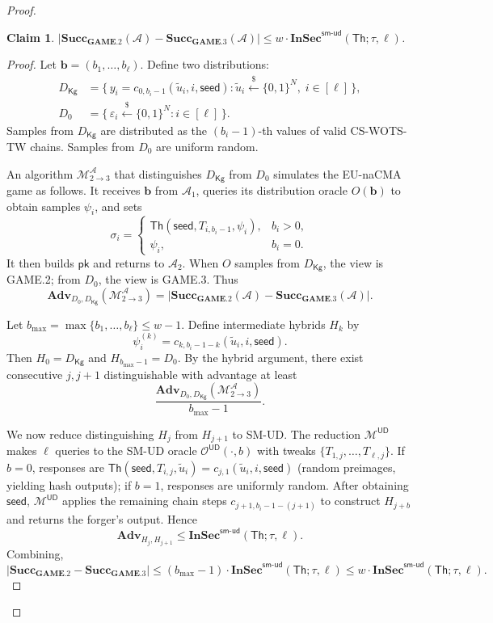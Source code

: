 \documentclass[11pt,a4paper]{article}
\newtheorem{claim}[theorem]{Claim}
\newcommand{\Th}{\mathsf{Th}}
\newcommand{\bits}{\{0,1\}}
\newcommand{\pk}{\mathsf{pk}}
\newcommand{\seed}{\mathsf{seed}}
\newcommand{\InSec}[1]{\mathbf{InSec}^{\mathsf{#1}}}
\newcommand{\Succ}{\mathbf{Succ}}
\newcommand{\Adv}{\mathbf{Adv}}
\newcommand{\GAME}{\mathbf{GAME}}
\newcommand{\Nbits}{N}
\begin{document}
\begin{proof}
\begin{claim}
$|\Succ_{\GAME.2}(\mathcal{A}) - \Succ_{\GAME.3}(\mathcal{A})| \le w \cdot \InSec{sm\text{-}ud}(\Th; \tau, \ell)$.
\end{claim}

\begin{proof}
Let $\mathbf{b} = (b_1,\ldots,b_\ell)$. Define two distributions:
\begin{align*}
D_{\mathsf{Kg}} &= \{\,y_i = c_{0,b_i-1}(\tilde{u}_i, i, \seed) : \tilde{u}_i \xleftarrow{\$} \bits^\Nbits,\; i \in [\ell]\,\},\\
D_0 &= \{\,\varepsilon_i \xleftarrow{\$} \bits^\Nbits : i \in [\ell]\,\}.
\end{align*}
Samples from $D_{\mathsf{Kg}}$ are distributed as the $(b_i-1)$-th values of valid CS-WOTS-TW chains. Samples from $D_0$ are uniform random.

An algorithm $\mathcal{M}^{\mathcal{A}}_{2\to 3}$ that distinguishes $D_{\mathsf{Kg}}$ from $D_0$ simulates the EU-naCMA game as follows. It receives $\mathbf{b}$ from $\mathcal{A}_1$, queries its distribution oracle $O(\mathbf{b})$ to obtain samples $\psi_i$, and sets
\[
\sigma_i =
\begin{cases}
\Th(\seed, T_{i,b_i-1}, \psi_i), & b_i>0,\\
\psi_i, & b_i=0.
\end{cases}
\]
It then builds $\pk$ and returns to $\mathcal{A}_2$. When $O$ samples from $D_{\mathsf{Kg}}$, the view is GAME.2; from $D_0$, the view is GAME.3. Thus
\[
\Adv_{D_0,D_{\mathsf{Kg}}}(\mathcal{M}^{\mathcal{A}}_{2\to 3}) = |\Succ_{\GAME.2}(\mathcal{A}) - \Succ_{\GAME.3}(\mathcal{A})|.
\]

Let $b_{\max} = \max\{b_1,\ldots,b_\ell\} \le w-1$. Define intermediate hybrids $H_k$ by
\[
\psi_i^{(k)} = c_{k, b_i-1-k}(\tilde{u}_i, i, \seed).
\]
Then $H_0 = D_{\mathsf{Kg}}$ and $H_{b_{\max}-1} = D_0$. By the hybrid argument, there exist consecutive $j,j+1$ distinguishable with advantage at least
\[
\frac{\Adv_{D_0,D_{\mathsf{Kg}}}(\mathcal{M}^{\mathcal{A}}_{2\to 3})}{b_{\max}-1}.
\]

We now reduce distinguishing $H_j$ from $H_{j+1}$ to SM-UD. The reduction $\mathcal{M}^{\mathsf{UD}}$ makes $\ell$ queries to the SM-UD oracle $\mathcal{O}^{\mathsf{UD}}(\cdot,b)$ with tweaks $\{T_{1,j},\ldots,T_{\ell,j}\}$. If $b=0$, responses are $\Th(\seed,T_{i,j},\tilde{u}_i) = c_{j,1}(\tilde{u}_i,i,\seed)$ (random preimages, yielding hash outputs); if $b=1$, responses are uniformly random. After obtaining $\seed$, $\mathcal{M}^{\mathsf{UD}}$ applies the remaining chain steps $c_{j+1, b_i-1-(j+1)}$ to construct $H_{j+b}$ and returns the forger's output. Hence
\[
\Adv_{H_j,H_{j+1}} \le \InSec{sm\text{-}ud}(\Th; \tau, \ell).
\]
Combining,
\[
|\Succ_{\GAME.2} - \Succ_{\GAME.3}|
\le (b_{\max}-1) \cdot \InSec{sm\text{-}ud}(\Th; \tau, \ell)
\le w \cdot \InSec{sm\text{-}ud}(\Th; \tau, \ell).
\]
\end{proof}


\end{proof}
\end{document}

